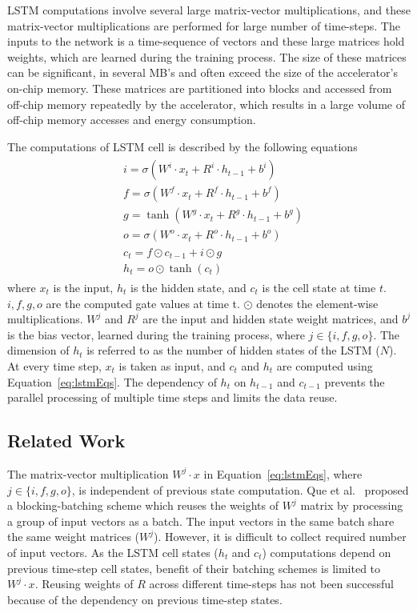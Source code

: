 \documentclass[a4paper,10pt]{article}
\begin{document}
LSTM computations involve several large matrix-vector multiplications, and these matrix-vector multiplications are performed for large number of time-steps. The inputs to the network is a time-sequence of vectors and these large matrices hold weights, which are learned during the training process. The size of these matrices can be significant, in several MB's and often exceed the size of the accelerator's on-chip memory. These matrices are partitioned into blocks and accessed from off-chip memory repeatedly by the accelerator, which results in a large volume of off-chip memory accesses and energy consumption.

The computations of LSTM cell is described by the following equations
\begin{align}\label{eq:lstmEqs}
	\begin{split}
		&i{=}{\sigma}(W^i{\cdot}x_t{+}R^i{\cdot}h_{t-1}{+}b^i)\\
		&f{=}{\sigma}(W^f{\cdot}x_t{+}R^f{\cdot}h_{t-1}{+}b^f)\\
		&g{=}{\tanh}(W^g{\cdot}x_t{+}R^g{\cdot}h_{t-1}{+}b^g)\\
		&o{=}{\sigma}(W^o{\cdot}x_t{+}R^o{\cdot}h_{t-1}{+}b^o)\\
		&c_{t}{=}f{\odot}c_{t-1}{+}i{\odot}g\\
		&h_{t}{=}o{\odot}{\tanh}(c_t)
	\end{split}	
\end{align}
where $x_t$ is the input, $h_t$ is the hidden state, and $c_t$ is the cell state at time $t$. $i,f,g,o$ are the computed gate values at time t. $\odot$ denotes the element-wise multiplications. $W^j$ and $R^j$ are the input and hidden state weight matrices, and $b^j$ is the bias vector, learned during the training process, where $j\in\{i,f,g,o\}$. The dimension of $h_t$ is referred to as the number of hidden states of the LSTM ($N$). 
At every time step, $x_t$ is taken as input, and $c_t$ and $h_t$ are computed using Equation~\eqref{eq:lstmEqs}. The dependency of $h_t$ on $h_{t-1}$ and $c_{t-1}$ prevents the parallel processing of multiple time steps and limits the data reuse.

\subsection{Related Work}
The matrix-vector multiplication $W^j\cdot x$ in Equation~\eqref{eq:lstmEqs}, where $j\in \{i,f,g,o\}$, is independent of previous state computation. Que et al.~\cite{que2019efficient} proposed a blocking-batching scheme which reuses the weights of $W^j$ matrix by processing a group of input vectors as a batch. The input vectors in the same batch share the same weight matrices ($W^j$). However, it is difficult to collect required number of input vectors. As the LSTM cell states ($h_t$ and $c_t$) computations depend on previous time-step cell states, benefit of their batching schemes is limited to $W^j\cdot x$. Reusing weights of $R$ across different time-steps has not been successful because of the dependency on previous time-step states.
\end{document}
